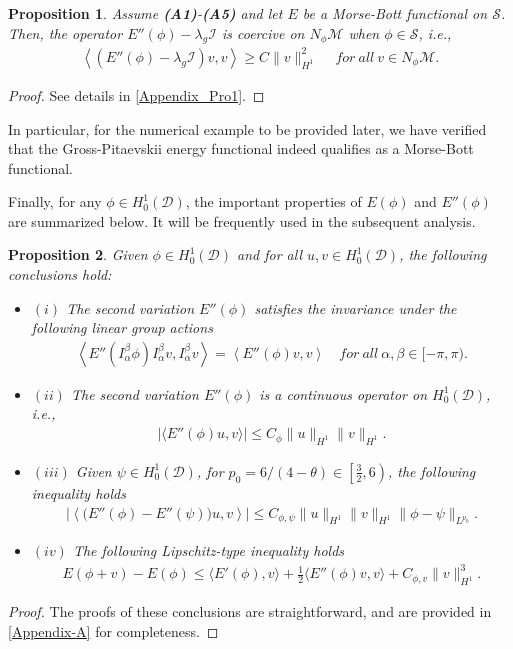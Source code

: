 \documentclass[preprint,3p]{elsarticle}
\newtheorem{prop}{Proposition}[section]
\begin{document}
\begin{prop}\label{Prop2}
	Assume {\bf (A1)}-{\bf (A5)} and let $E$ be a
	Morse-Bott functional on $\mathcal{S}$. Then, the operator $E''(\phi)-\lambda_g\mathcal{I}$ is coercive on $N_{\phi}\mathcal{M}$ when $\phi\in\mathcal{S}$, i.e., 
	\begin{align*}
		\left\langle(E''(\phi)-\lambda_g\mathcal{I})v,v\right\rangle\ge C\|v\|^2_{H^1}\quad\ for\ all\ v\in N_{\phi}\mathcal{M}.
	\end{align*}
\end{prop} 
\begin{proof} 
	See details in \ref{Appendix_Pro1}.
\end{proof}
In particular, for the numerical example to be provided later, we have verified that the Gross-Pitaevskii energy functional  indeed qualifies as a Morse-Bott functional.

Finally, for any $\phi\in H_0^1(\mathcal{D})$, the important properties of $E(\phi)$ and $E''(\phi)$ are summarized below. It will be frequently used in the subsequent analysis.
\begin{prop}\label{Property-of-E''}
	Given $\phi\in H_0^1(\mathcal{D})$ and for all $u, v\in H_0^1(\mathcal{D})$, the following conclusions hold:
	\begin{itemize}[label={}, labelsep=0pt, leftmargin=*]
		\item $(i)$ {The second variation} $E''(\phi)$ satisfies the invariance under the following linear group actions
		\begin{align*}
			\left\langle E''(I_{\alpha}^{\beta}\phi)I_{\alpha}^{\beta}v,I_{\alpha}^{\beta}v\right\rangle=\left\langle E''(\phi)v,v\right\rangle \quad for\ all\ \alpha,\beta\in[-\pi, \pi). 
		\end{align*}
		\item $(ii)$ {The second variation} $E''(\phi)$ is a continuous operator on $H_0^1(\mathcal{D})$, i.e.,
		\begin{align*}
			\left|\big\langle E''(\phi)u,v\big\rangle\right|\le C_{\phi}\|u\|_{H^1}\|v\|_{H^1}.
		\end{align*}
		\item $(iii)$ Given $\psi\in H_0^1(\mathcal{D})$, for {$p_0=6/(4-\theta)\in\left[\frac{3}{2},6\right)$}, the following inequality holds
		\begin{align*}
			\left|\left\langle \big(E''(\phi)-E''(\psi)\big)u,v\right\rangle\right|\le C_{\phi,\psi}\|u\|_{H^1}\|v\|_{H^1}\|\phi-\psi\|_{L^{p_0}}.
		\end{align*}
		\item $(iv)$ The following Lipschitz-type inequality holds
		\begin{align*}
			E(\phi+v)-E(\phi)\le \big\langle E'(\phi),v\big\rangle+\frac{1}{2}\big\langle E''(\phi)v,v\big\rangle+C_{\phi,v}\|v\|^3_{H^1}.
		\end{align*}
	\end{itemize}
\end{prop}
\begin{proof}
	The proofs of these conclusions are straightforward, and are provided in \ref{Appendix-A} for completeness.
\end{proof}
\end{document}

